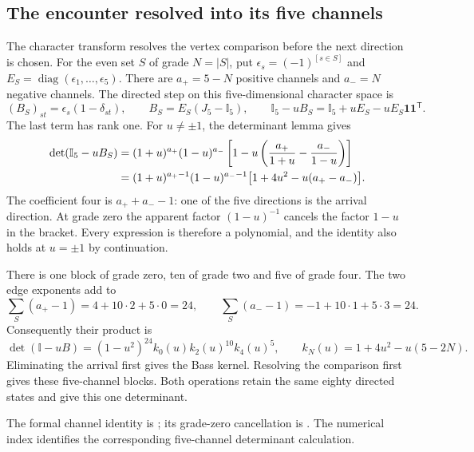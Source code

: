 \documentclass[aps,prx,onecolumn,10pt,notitlepage,nofootinbib,longbibliography]{revtex4-2}
\numberwithin{equation}{section}
\numberwithin{table}{section}
\newcommand{\Id}{\mathbb I}
\newcommand{\diag}{\operatorname{diag}}
\begin{document}
\subsection{The encounter resolved into its five channels}
\label{sec:encounterfactor}

The character transform resolves the vertex comparison before the next
direction is chosen. For the even set $S$ of grade $N=|S|$, put
$\epsilon_s=(-1)^{[s\in S]}$ and
$E_S=\diag(\epsilon_1,\ldots,\epsilon_5)$.
There are $a_+=5-N$ positive channels and $a_-=N$ negative channels.
The directed step on this five-dimensional character space is
\begin{equation}
 (B_S)_{st}=\epsilon_s(1-\delta_{st}),\qquad
 B_S=E_S(J_5-\Id_5),\qquad
 \Id_5-uB_S=\Id_5+uE_S-uE_S\mathbf1\mathbf1^{\mathsf T}.
 \label{eq:encounterchannelmatrix}
\end{equation}
The last term has rank one. For $u\ne\pm1$, the determinant lemma gives
\begin{align}
 \det(\Id_5-uB_S)
 &=(1+u)^{a_+}(1-u)^{a_-}
 \left[1-u\left(\frac{a_+}{1+u}-\frac{a_-}{1-u}\right)\right]\notag\\
 &=(1+u)^{a_+-1}(1-u)^{a_--1}
 \bigl[1+4u^2-u(a_+-a_-)\bigr].
 \label{eq:encounterfactor}
\end{align}
The coefficient four is $a_++a_--1$: one of the five directions is the
arrival direction. At grade zero the apparent factor $(1-u)^{-1}$
cancels the factor $1-u$ in the bracket. Every expression is therefore a
polynomial, and the identity also holds at $u=\pm1$ by continuation.

There is one block of grade zero, ten of grade two and five of grade four.
The two edge exponents add to
\begin{equation}
 \sum_S(a_+-1)=4+10\cdot2+5\cdot0=24,\qquad
 \sum_S(a_--1)=-1+10\cdot1+5\cdot3=24.
 \label{eq:encounteredgecounts}
\end{equation}
Consequently their product is
\begin{equation}
 \det(\Id-uB)
 =(1-u^2)^{24}k_0(u)k_2(u)^{10}k_4(u)^5,
 \qquad k_N(u)=1+4u^2-u(5-2N).
 \label{eq:encounterproduct}
\end{equation}
Eliminating the arrival first gives the Bass kernel. Resolving the
comparison first gives these five-channel blocks. Both operations retain
the same eighty directed states and give this one determinant.

The formal channel identity is
; its grade-zero cancellation is
. The numerical index identifies the
corresponding five-channel determinant calculation.
\end{document}
